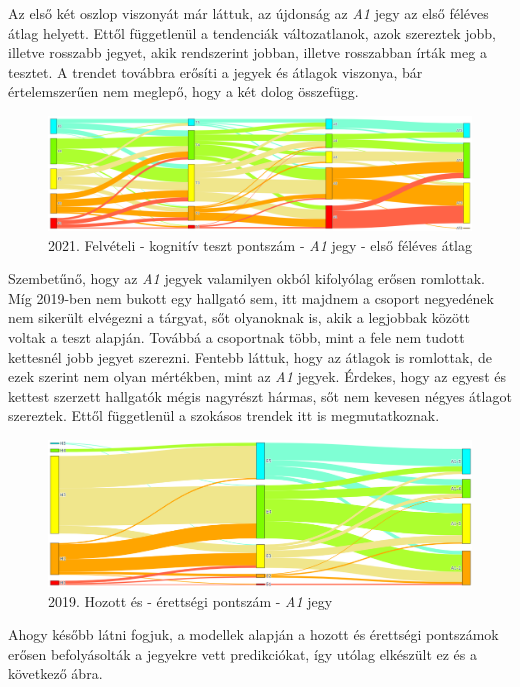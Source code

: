 \documentclass[12pt]{article}
\begin{document}
Az első két oszlop viszonyát már láttuk, az újdonság az \textit{A1} jegy az első féléves átlag helyett. Ettől függetlenül a tendenciák változatlanok, azok szereztek jobb, illetve rosszabb jegyet, akik rendszerint jobban, illetve rosszabban írták meg a tesztet. A trendet továbbra erősíti a jegyek és átlagok viszonya, bár értelemszerűen nem meglepő, hogy a két dolog összefügg.

\begin{figure}[H]
\centering
\includegraphics[scale=0.5]{kepek/2021_felvi_teszt_a1_atlag.png}
\caption{2021. Felvételi - kognitív teszt pontszám - \textit{A1} jegy - első féléves átlag}
\label{fig:2021_felvi_teszt_a1_atlag}
\end{figure}

Szembetűnő, hogy az \textit{A1} jegyek valamilyen okból kifolyólag erősen romlottak. Míg 2019-ben nem bukott egy hallgató sem, itt majdnem a csoport negyedének nem sikerült elvégezni a tárgyat, sőt olyanoknak is, akik a legjobbak között voltak a teszt alapján. Továbbá a csoportnak több, mint a fele nem tudott kettesnél jobb jegyet szerezni. Fentebb láttuk, hogy az átlagok is romlottak, de ezek szerint nem olyan mértékben, mint az \textit{A1} jegyek. Érdekes, hogy az egyest és kettest szerzett hallgatók mégis nagyrészt hármas, sőt nem kevesen négyes átlagot szereztek. Ettől függetlenül a szokásos trendek itt is megmutatkoznak.
 
\begin{figure}[H]
\centering
\includegraphics[scale=0.6]{kepek/2019_hozott_erett_A1.png}
\caption{2019. Hozott és - érettségi pontszám - \textit{A1} jegy}
\label{fig:2019_hozott_erett_A1}
\end{figure}
Ahogy később látni fogjuk, a modellek alapján a hozott és érettségi pontszámok erősen befolyásolták a jegyekre vett predikciókat, így utólag elkészült ez és a következő ábra.
\end{document}
